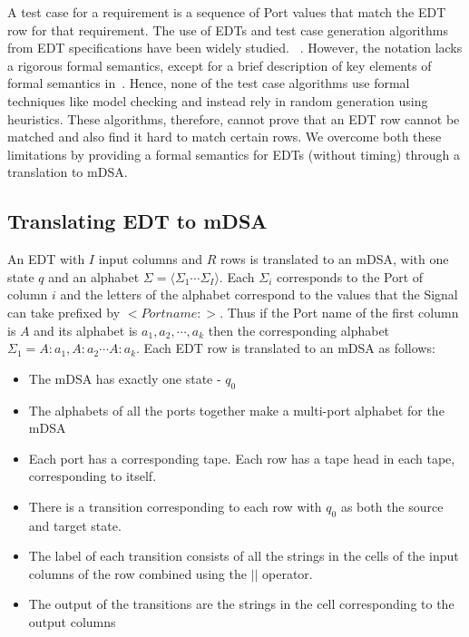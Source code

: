 A test case for a requirement is a sequence of Port values  that match the
EDT row for that requirement. The use of EDTs and test case generation
algorithms from EDT specifications have been widely studied.
~\cite{DBLP:conf/enase/VenkateshSZA15a,DBLP:conf/icst/AgrawalVSZV20}. However, the notation lacks a rigorous
formal semantics, except for a brief description of key elements of formal
semantics in~\cite{DBLP:conf/date/VenkateshSKA14}. Hence, none of the test case algorithms use
formal techniques like model checking and instead rely in random generation
using heuristics. These algorithms, therefore, cannot prove that an EDT row
cannot be matched and also find it hard to match certain rows. We overcome both
these limitations by providing a formal semantics for EDTs (without timing)
through a translation to mDSA.

\subsection{Translating EDT to mDSA}

An EDT with $I$ input columns and $R$ rows is translated to an mDSA, with one
state $q$ and an alphabet $\Sigma = \langle \Sigma_1 \cdots \Sigma_I \rangle$.
Each $\Sigma_i$ corresponds to the Port of column $i$ and the
letters of the alphabet correspond to the values that the Signal can take
prefixed by $<Portname:>$. Thus if the Port name of the first
column is $A$ and its alphabet is ${ a_1, a_2, \cdots, a_k}$ then the
corresponding alphabet $\Sigma_1 = {A:a_1, A:a_2 \cdots A:a_k}$. 
Each EDT row is translated to an mDSA as follows:
\begin{itemize}
\item The mDSA has exactly one state - $q_0$
\item 
The alphabets of all the ports together make a multi-port alphabet for the mDSA
\item
Each port has a corresponding tape. Each row has a tape head in each tape, corresponding to itself.
\item
There is a transition corresponding to each row with $q_0$ as both the source and target state. 
\item
The label of each transition consists of all the strings in the cells of the input columns of the row combined using the $||$ operator.
\item 
The output of the transitions are the strings in the cell corresponding to the output columns
\end{itemize}

